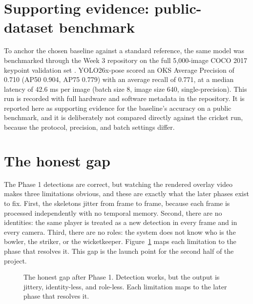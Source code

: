 \documentclass[oneside,openany]{book}
\begin{document}
\section{Supporting evidence: public-dataset benchmark}
To anchor the chosen baseline against a standard reference, the same model was benchmarked
through the Week 3 repository on the full 5{,}000-image COCO 2017 keypoint validation set
\cite{lin2014coco}. YOLO26x-pose scored an OKS Average Precision of 0.710 (AP50 0.904, AP75
0.779) with an average recall of 0.771, at a median latency of 42.6 ms per image (batch size 8,
image size 640, single-precision). This run is recorded with full hardware and software
metadata in the repository. It is reported here as supporting evidence for the baseline's
accuracy on a public benchmark, and it is deliberately not compared directly against the cricket
run, because the protocol, precision, and batch settings differ.

\section{The honest gap}
The Phase 1 detections are correct, but watching the rendered overlay video makes three
limitations obvious, and these are exactly what the later phases exist to fix. First, the
skeletons jitter from frame to frame, because each frame is processed independently with no
temporal memory. Second, there are no identities: the same player is treated as a new detection
in every frame and in every camera. Third, there are no roles: the system does not know who is
the bowler, the striker, or the wicketkeeper. Figure~\ref{fig:gap} maps each limitation to the
phase that resolves it. This gap is the launch point for the second half of the project.

\begin{figure}[ht]
\begin{center}
\caption{The honest gap after Phase 1. Detection works, but the output is jittery, identity-less,
and role-less. Each limitation maps to the later phase that resolves it.}
\label{fig:gap}
\end{center}
\end{figure}
\end{document}
